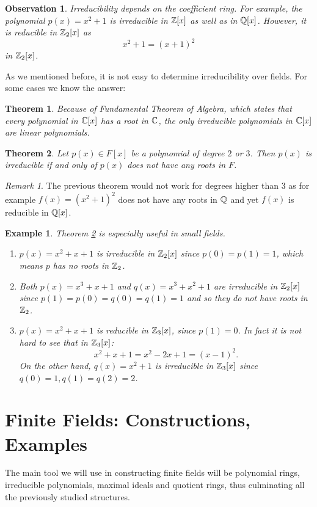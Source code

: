 \documentclass[12pt]{article}
\theoremstyle{plain}
\newtheorem{example}{Example}
\newtheorem{observation}{Observation}
\newtheorem{theorem}{Theorem}
\theoremstyle{definition}
\theoremstyle{remark}
\newtheorem{remark}{Remark}
\begin{document}
\begin{observation}
Irreducibility depends on the coefficient ring. For example, the polynomial $p(x)=x^2+1$ is irreducible in $\mathbb{Z}[x]$ as well as in $\mathbb{Q}[x]$. However, it is reducible in $\mathbb{Z}_2[x]$ as
$$x^2+1=(x+1)^2$$
in $\mathbb{Z}_2[x]$.
\end{observation}

As we mentioned before, it is not easy to determine irreducibility over fields. For some cases we know the answer:
\begin{theorem}
Because of Fundamental Theorem of Algebra, which states that every polynomial in $\mathbb{C}[x]$ has a root in $\mathbb{C}$, the only irreducible polynomials in $\mathbb{C}[x]$ are linear polynomials.
\end{theorem}

\begin{theorem}\label{irr}
Let $p(x)\in F[x]$ be a polynomial of degree $2$ or $3$. Then $p(x)$ is irreducible if and only of $p(x)$ does not have any roots in $F$.
\end{theorem}
\begin{remark}
The previous theorem would not work for degrees higher than $3$ as for example $f(x)=(x^2+1)^2$ does not have any roots in $\mathbb{Q}$ and yet $f(x)$ is reducible in $\mathbb{Q}[x]$.
\end{remark}
\begin{example}
Theorem \ref{irr} is especially useful in small fields.
\begin{enumerate}
    \item $p(x)=x^2+x+1$ is irreducible in $\mathbb{Z}_2[x]$ since $p(0)=p(1)=1$, which means $p$ has no roots in $\mathbb{Z}_2$.
    \item Both $p(x)=x^3+x+1$ and $q(x)=x^3+x^2+1$ are irreducible in $\mathbb{Z}_2[x]$ since $p(1)=p(0)=q(0)=q(1)=1$ and so they do not have roots in $\mathbb{Z}_2$.
    \item $p(x)=x^2+x+1$ is reducible in $\mathbb{Z}_3[x]$, since $p(1)=0$. In fact it is not hard to see that in $\mathbb{Z}_3[x]$:
    $$x^2+x+1 = x^2-2x+1 = (x-1)^2.$$
    On the other hand, $q(x)=x^2+1$ is irreducible in $\mathbb{Z}_3[x]$ since $q(0)=1, q(1)=q(2)=2$.
\end{enumerate}
\end{example}
\section{Finite Fields: Constructions, Examples}
The main tool we will use in constructing finite fields will be polynomial rings, irreducible polynomials, maximal ideals and quotient rings, thus culminating all the previously studied structures.
\end{document}
